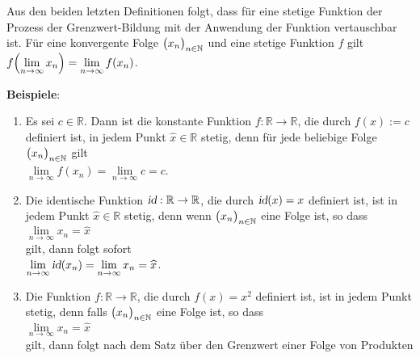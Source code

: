 \noindent
Aus den beiden letzten Definitionen folgt, dass
f\"ur eine stetige Funktion der Prozess der Grenzwert-Bildung mit der Anwendung der Funktion
vertauschbar ist.  F\"ur eine konvergente Folge $\bigl(x_n\bigr)_{n\in\mathbb{N}}$ und eine stetige Funktion $f$ gilt 
      \\[0.2cm]
      \hspace*{1.3cm}      
      $f\Bigl(\lim\limits_{n\rightarrow\infty} x_n\Bigr) = \lim\limits_{n\rightarrow\infty} f(x_n)$.
\vspace*{0.3cm}

\noindent
\textbf{Beispiele}:
\begin{enumerate}
\item Es sei $c \in \mathbb{R}$.  Dann ist die konstante Funktion
      $f: \mathbb{R} \rightarrow \mathbb{R}$, die durch $f(x) := c$ definiert ist, in
      jedem Punkt $\widehat{x}\in\mathbb{R}$ stetig, denn f\"ur jede beliebige Folge $\bigl(x_n\bigr)_{n\in\mathbb{N}}$ gilt 
      \\[0.2cm]
      \hspace*{1.3cm}      
      $\lim\limits_{n\rightarrow\infty} f(x_n) = \lim\limits_{n\rightarrow\infty} c = c$.
\item Die identische Funktion $\textsl{id}:\mathbb{R} \rightarrow \mathbb{R}$, die durch 
      $\textsl{id}(x) = x$ definiert ist, ist in jedem Punkt $\widehat{x}\in\mathbb{R}$ stetig,
      denn wenn $\bigl(x_n\bigr)_{n\in\mathbb{N}}$ eine Folge ist, so dass
      \\[0.2cm]
      \hspace*{1.3cm}      
      $\lim\limits_{n\rightarrow\infty} x_n = \widehat{x}$
      \\[0.2cm]
      gilt, dann folgt sofort 
      \\[0.2cm]
      \hspace*{1.3cm}      
      $\lim\limits_{n\rightarrow\infty} \textsl{id}(x_n) = \lim\limits_{n\rightarrow\infty} x_n = \widehat{x}$.
\item Die Funktion $f: \mathbb{R} \rightarrow \mathbb{R}$, die durch
      $f(x) = x^2$ definiert ist, ist in jedem Punkt stetig, denn falls
      $\bigl(x_n\bigr)_{n\in\mathbb{N}}$ eine Folge ist, so dass 
      \\[0.2cm]
      \hspace*{1.3cm}      
      $\lim\limits_{n\rightarrow\infty} x_n = \widehat{x}$ 
      \\[0.2cm]
      gilt, dann folgt nach dem Satz \"uber den Grenzwert einer Folge von Produkten
      \\[0.2cm]
      \hspace*{1.3cm}      

\end{enumerate}
